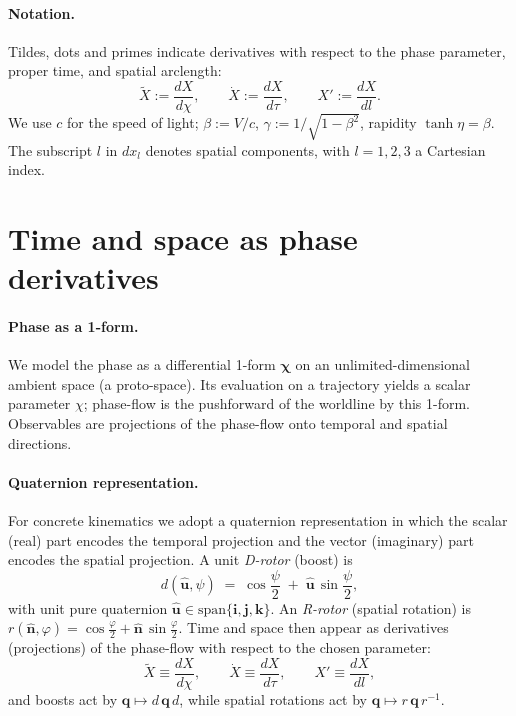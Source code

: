 \documentclass[11pt]{article}
\numberwithin{equation}{section}
\providecommand{\bi}{\mathbf{i}}
\providecommand{\bj}{\mathbf{j}}
\providecommand{\bk}{\mathbf{k}}
\begin{document}
\paragraph{Notation.}
Tildes, dots and primes indicate derivatives with respect to the phase parameter, proper time, and spatial arclength:
\begin{equation}
\tilde X := \frac{dX}{d\chi},\qquad \dot X := \frac{dX}{d\tau},\qquad X' := \frac{dX}{dl}.
\end{equation}
We use $c$ for the speed of light; $\beta := V/c$, $\gamma := 1/\sqrt{1-\beta^2}$, rapidity $\tanh \eta = \beta$.
The subscript $l$ in $dx_l$ denotes spatial components, with $l=1,2,3$ a Cartesian index.

\section{Time and space as phase derivatives}\n
\paragraph{Phase as a 1-form.}
We model the phase as a differential 1-form $\boldsymbol{\chi}$ on an unlimited-dimensional
ambient space (a proto-space). Its evaluation on a trajectory yields a scalar parameter $\chi$; phase-flow
is the pushforward of the worldline by this 1-form. Observables are projections of the phase-flow
onto temporal and spatial directions.

\paragraph{Quaternion representation.}
For concrete kinematics we adopt a quaternion representation in which the scalar (real) part
encodes the temporal projection and the vector (imaginary) part encodes the spatial projection.
A unit \emph{D-rotor} (boost) is
\begin{equation}
d(\hat{\mathbf u},\psi)\;=\;\cos\frac{\psi}{2}\;+\;\hat{\mathbf u}\,\sin\frac{\psi}{2},
\end{equation}
with unit pure quaternion $\hat{\mathbf u}\in\mathrm{span}\{\bi,\bj,\bk\}$. An \emph{R-rotor} (spatial
rotation) is $r(\hat{\mathbf n},\varphi)=\cos\frac{\varphi}{2}+\hat{\mathbf n}\,\sin\frac{\varphi}{2}$.
Time and space then appear as derivatives (projections) of the phase-flow with respect to the
chosen parameter:
\begin{equation}
\tilde X \equiv \frac{dX}{d\chi},\qquad \dot X \equiv \frac{dX}{d\tau},\qquad X' \equiv \frac{dX}{dl},
\end{equation}
and boosts act by $ \mathbf q\mapsto d\,\mathbf q\,d$, while spatial rotations act by
$\mathbf q\mapsto r\,\mathbf q\,r^{-1}$.
\end{document}
